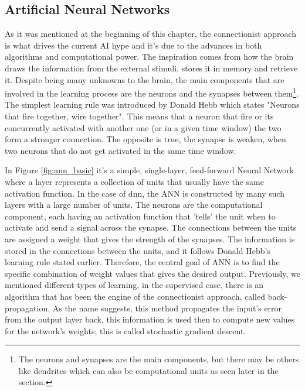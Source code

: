 \subsection{Artificial Neural Networks} \label{s:ann_overview}

As it was mentioned at the beginning of this chapter, the connectionist approach is what drives the current AI hype and it's due to the advances in both algorithms and computational power. The inspiration comes from how the brain draws the information from the external stimuli, stores it in memory and retrieve it. Despite being many unknowns to the brain, the main components that are involved in the learning process are the neurons and the synapses between them\footnote{The neurons and synapses are the main components, but there may be others like dendrites which can also be computational units as seen later in the section.}. The simplest learning rule was introduced by Donald Hebb which states "Neurons that fire together, wire together"\cite{Hebb_Donald1949-nn}. This means that a neuron that fire or its concurrently activated with another one (or in a given time window) the two form a stronger connection. The opposite is true, the synapse is weaken, when two neurons that do not get activated in the same time window.

In Figure \ref{fig:ann_basic} it's a simple, single-layer, feed-forward Neural Network where a layer represents a collection of units that usually have the same activation function. In the case of \acrfull{dnn}, the ANN is constructed by many such layers with a large number of units. The neurons are the computational component, each having an activation function that 'tells' the unit when to activate and send a signal across the synapse. The connections between the units are assigned a weight that gives the strength of the synapses. The information is stored in the connections between the units, and it follows Donald Hebb's learning rule stated earlier. Therefore, the central goal of ANN is to find the specific combination of weight values that gives the desired output. Previously, we mentioned different types of learning, in the supervised case, there is an algorithm that has been the engine of the connectionist approach, called back-propagation. As the name suggests, this method propagates the input's error from the output layer back, this information is used then to compute new values for the network's weights; this is called stochastic gradient descent.

